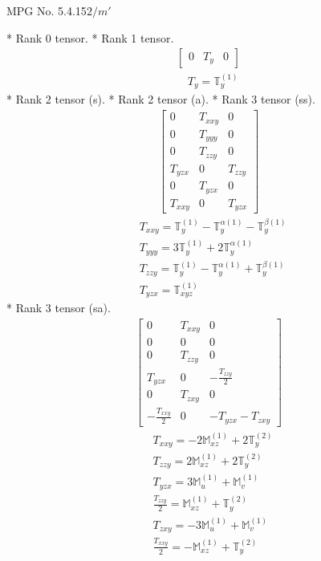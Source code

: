 \documentclass[fleqn,8pt,landscape]{jsarticle}
\begin{document}
\setcounter{MaxMatrixCols}{32}

\renewcommand{\tablename}{Table~}
\renewcommand{\figurename}{Figure~}
\begin{center}
\LARGE
MPG No. 5.4.15\quad$2/m'$
\end{center}
* Rank 0 tensor.
* Rank 1 tensor.
\begin{align*}
\begin{bmatrix} 0 & T_{y} & 0 \end{bmatrix}
\end{align*}
\begin{align*}
& T_{y} = \mathbb{T}_{y}^{(1)}
\end{align*}
* Rank 2 tensor (s).
* Rank 2 tensor (a).
* Rank 3 tensor (ss).
\begin{align*}
\begin{bmatrix} 0 & T_{xxy} & 0 \\ 0 & T_{yyy} & 0 \\ 0 & T_{zzy} & 0 \\ T_{yzx} & 0 & T_{zzy} \\ 0 & T_{yzx} & 0 \\ T_{xxy} & 0 & T_{yzx} \end{bmatrix}
\end{align*}
\begin{align*}
& T_{xxy} = \mathbb{T}_{y}^{(1)} - \mathbb{T}_{y}^{\alpha(1)} - \mathbb{T}_{y}^{\beta(1)} \\
& T_{yyy} = 3 \mathbb{T}_{y}^{(1)} + 2 \mathbb{T}_{y}^{\alpha(1)} \\
& T_{zzy} = \mathbb{T}_{y}^{(1)} - \mathbb{T}_{y}^{\alpha(1)} + \mathbb{T}_{y}^{\beta(1)} \\
& T_{yzx} = \mathbb{T}_{xyz}^{(1)}
\end{align*}
* Rank 3 tensor (sa).
\begin{align*}
\begin{bmatrix} 0 & T_{xxy} & 0 \\ 0 & 0 & 0 \\ 0 & T_{zzy} & 0 \\ T_{yzx} & 0 & - \frac{T_{zzy}}{2} \\ 0 & T_{zxy} & 0 \\ - \frac{T_{xxy}}{2} & 0 & - T_{yzx} - T_{zxy} \end{bmatrix}
\end{align*}
\begin{align*}
& T_{xxy} = - 2 \mathbb{M}_{xz}^{(1)} + 2 \mathbb{T}_{y}^{(2)} \\
& T_{zzy} = 2 \mathbb{M}_{xz}^{(1)} + 2 \mathbb{T}_{y}^{(2)} \\
& T_{yzx} = 3 \mathbb{M}_{u}^{(1)} + \mathbb{M}_{v}^{(1)} \\
& \frac{T_{zzy}}{2} = \mathbb{M}_{xz}^{(1)} + \mathbb{T}_{y}^{(2)} \\
& T_{zxy} = - 3 \mathbb{M}_{u}^{(1)} + \mathbb{M}_{v}^{(1)} \\
& \frac{T_{xxy}}{2} = - \mathbb{M}_{xz}^{(1)} + \mathbb{T}_{y}^{(2)}
\end{align*}
\end{document}
